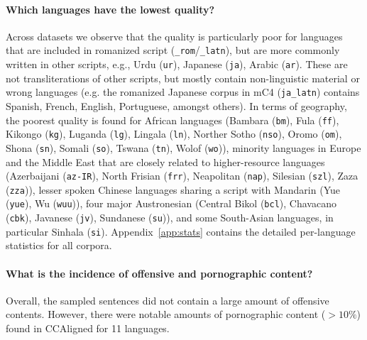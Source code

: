 \paragraph{Which languages have the lowest quality?} Across datasets we observe that the quality is particularly poor for languages that are included in romanized script (\texttt{\_rom}/\texttt{\_latn}), but are more commonly written in other scripts, e.g., Urdu (\texttt{ur}), Japanese (\texttt{ja}), Arabic (\texttt{ar}).
These are not transliterations of other scripts, but mostly contain non-linguistic material or wrong languages (e.g. the romanized Japanese corpus in mC4 (\texttt{ja\_latn}) contains Spanish, French, English, Portuguese, amongst others). %
In terms of geography, the poorest quality is found for African languages (Bambara (\texttt{bm}), Fula (\texttt{ff}), Kikongo (\texttt{kg}), Luganda (\texttt{lg}), Lingala (\texttt{ln}), Norther Sotho (\texttt{nso}), Oromo (\texttt{om}), Shona (\texttt{sn}), Somali (\texttt{so}), Tswana (\texttt{tn}), Wolof (\texttt{wo})), minority languages in Europe and the Middle East that are closely related to higher-resource languages (Azerbaijani (\texttt{az-IR}), North Frisian (\texttt{frr}), Neapolitan (\texttt{nap}), Silesian (\texttt{szl}), Zaza (\texttt{zza})), lesser spoken Chinese languages sharing a script with Mandarin (Yue (\texttt{yue}), Wu (\texttt{wuu})), four major Austronesian (Central Bikol (\texttt{bcl}), Chavacano (\texttt{cbk}), Javanese (\texttt{jv}), Sundanese (\texttt{su})), and some South-Asian languages, in particular Sinhala (\texttt{si}).
Appendix~\ref{app:stats} contains the detailed per-language statistics for all corpora.

\paragraph{What is the incidence of offensive and pornographic content?}
Overall, the sampled sentences did not contain a large amount of offensive contents. However, there were notable amounts of pornographic content ($>10\%$) found in CCAligned for 11 languages. %

